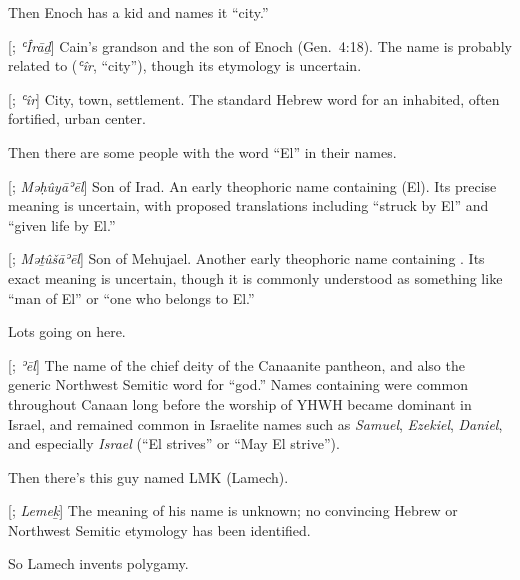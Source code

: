 {
}
{
}
{
	Then Enoch has a kid and names it ``city.''
	
	[; \textit{ʿÎrāḏ}]{
		Cain's grandson and the son of Enoch (Gen.~4:18). The name is
		probably related to  (\textit{ʿîr}, ``city''), though its
		etymology is uncertain.
	}
	
	[; \textit{ʿîr}]{
		City, town, settlement. The standard Hebrew word for an inhabited,
		often fortified, urban center.
	}
	
	Then there are some people with the word ``El'' in their names.
	
	[; \textit{Məḥûyāʾēl}]{
		Son of Irad. An early theophoric name containing  (El).
		Its precise meaning is uncertain, with proposed translations including
		``struck by El'' and ``given life by El.''
	}
	
	[; \textit{Məṯûšāʾēl}]{
		Son of Mehujael. Another early theophoric name containing .
		Its exact meaning is uncertain, though it is commonly understood
		as something like ``man of El'' or ``one who belongs to El.''
	}
	
	Lots going on here.
	
	[; \textit{ʾēl}]{
		The name of the chief deity of the Canaanite pantheon, and also the
		generic Northwest Semitic word for ``god.'' Names containing
		 were common throughout Canaan long before the worship of
		YHWH became dominant in Israel, and remained common in Israelite
		names such as \textit{Samuel}, \textit{Ezekiel}, \textit{Daniel},
		and especially \textit{Israel} (``El strives'' or ``May El strive'').
	}

	Then there's this guy named LMK (Lamech).

	[; \textit{Lemeḵ}]{
		The meaning of his name is unknown; no convincing Hebrew or
		Northwest Semitic etymology has been identified.
	}

}

{
}
{
}
{
	So Lamech invents polygamy.
}

